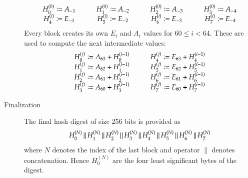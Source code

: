 \begin{description}
    \[
      \begin{array}{cp{10pt}cp{10pt}cp{10pt}c}
        H_0^{(0)} \coloneqq A_{-1}  & &  H_1^{(0)} \coloneqq A_{-2}  & &  H_2^{(0)} \coloneqq A_{-3}  & &  H_3^{(0)} \coloneqq A_{-4} \\
        H_4^{(i)} \coloneqq E_{-1}  & &  H_5^{(i)} \coloneqq E_{-2}  & &  H_6^{(i)} \coloneqq E_{-3}  & &  H_7^{(i)} \coloneqq E_{-4} \\
      \end{array}
    \]
    Every block creates its own $E_{i}$ and $A_{i}$ values for $60 \leq i < 64$.
    These are used to compute the next intermediate values:
    \[
      \begin{array}{lp{10pt}r}
        H_0^{(j)} \coloneqq A_{63} + H_0^{(i-1)}  & &  H_4^{(j)} \coloneqq E_{63} + H_4^{(i-1)} \\
        H_1^{(j)} \coloneqq A_{62} + H_1^{(i-1)}  & &  H_5^{(j)} \coloneqq E_{62} + H_5^{(i-1)} \\
        H_2^{(j)} \coloneqq A_{61} + H_2^{(i-1)}  & &  H_6^{(j)} \coloneqq E_{61} + H_6^{(i-1)} \\
        H_3^{(j)} \coloneqq A_{60} + H_3^{(i-1)}  & &  H_7^{(j)} \coloneqq E_{60} + H_7^{(i-1)}
      \end{array}
    \]
  \item[Finalization]
    The final hash digest of size 256 bits is provided as
    \[
      H_0^{(N)} \,\|\,
      H_1^{(N)} \,\|\,
      H_2^{(N)} \,\|\,
      H_3^{(N)} \,\|\,
      H_4^{(N)} \,\|\,
      H_5^{(N)} \,\|\,
      H_6^{(N)} \,\|\,
      H_7^{(N)}
    \]
    where $N$ denotes the index of the last block and operator $\|$ denotes
    concatenation. Hence $H_0^{(N)}$ are the four least significant bytes of the digest.
\end{description}
